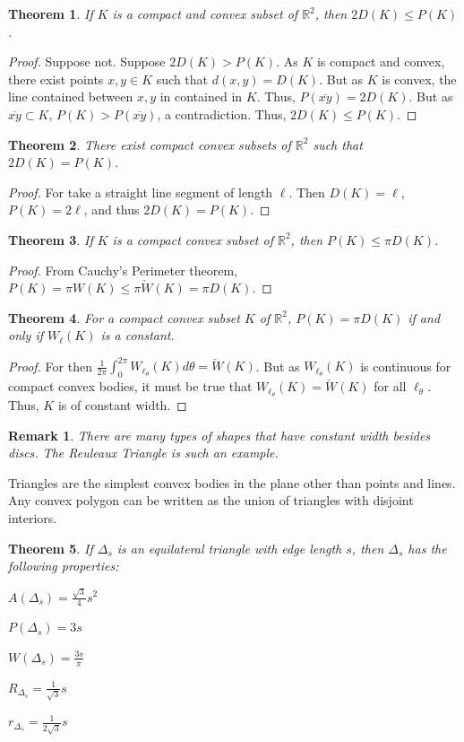 \documentclass[12pt,oneside]{book}
\theoremstyle{mystyle}
\newtheorem{theorem}{Theorem}[section]
\newtheorem{remark}{Remark}[section]
\begin{document}
\begin{theorem}
If $K$ is a compact and convex subset of $\mathbb{R}^2$, then $2D(K)\leq P(K)$.
\end{theorem}
\begin{proof}
Suppose not. Suppose $2D(K) >P(K)$. As $K$ is compact and convex, there exist points $x,y\in K$ such that $d(x,y) = D(K)$. But as $K$ is convex, the line contained between $x,y$ in contained in $K$. Thus, $P(\overline{xy}) = 2D(K)$. But as $\overline{xy}\subset K$, $P(K)>P(\overline{xy})$, a contradiction. Thus, $2D(K) \leq P(K)$.
\end{proof}
%
\begin{theorem}
There exist compact convex subsets of $\mathbb{R}^2$ such that $2D(K) = P(K)$.
\end{theorem}
\begin{proof}
For take a straight line segment of length $\ell$. Then $D(K) = \ell$, $P(K) = 2\ell$, and thus $2D(K) = P(K)$.
\end{proof}
%
\begin{theorem}
If $K$ is a compact convex subset of $\mathbb{R}^2$, then $P(K) \leq \pi D(K)$.
\end{theorem}
\begin{proof}
From Cauchy's Perimeter theorem, $P(K) = \pi W(K) \leq \pi \check{W}(K) = \pi D(K)$.
\end{proof}
%
\begin{theorem}
For a compact convex subset $K$ of $\mathbb{R}^2$, $P(K) = \pi D(K)$ if and only if $W_{\ell}(K)$ is a constant.
\end{theorem}
\begin{proof}
For then $\frac{1}{2\pi} \int_{0}^{2\pi} W_{\ell_{\theta}}(K) d\theta = \check{W}(K)$. But as $W_{\ell_{\theta}}(K)$ is continuous for compact convex bodies, it must be true that $W_{\ell_{\theta}}(K) = \check{W}(K)$ for all $\ell_{\theta}$. Thus, $K$ is of constant width.
\end{proof}
%
\begin{remark}
There are many types of shapes that have constant width besides discs. The Reuleaux Triangle is such an example.
\end{remark}
%
Triangles are the simplest convex bodies in the plane other than points and lines. Any convex polygon can be written as the union of triangles with disjoint interiors. 
%
\begin{theorem}
If $\Delta_s$ is an equilateral triangle with edge length $s$, then $\Delta_s$ has the following properties:
\begin{enumerate}
\begin{multicols}{5}
\item $A(\Delta_s) = \frac{\sqrt{3}}{4}s^2$
\item $P(\Delta_s) = 3s$
\item $W(\Delta_s) = \frac{3s}{\pi}$
\item $R_{\Delta_s} = \frac{1}{\sqrt{3}}s$
\item $r_{\Delta_s} = \frac{1}{2\sqrt{3}}s$
\end{multicols}
\end{enumerate}
\end{theorem}
\end{document}
